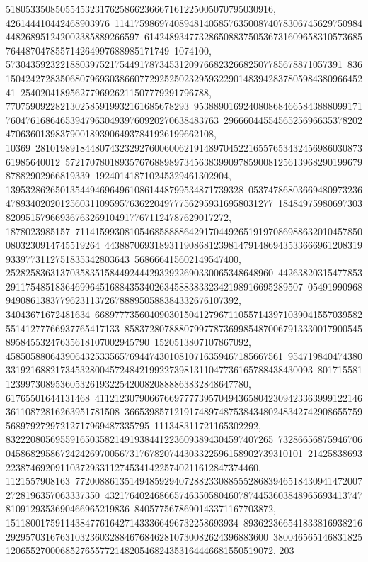 {{{518053350850554532317625866236667161225005070795030916, 426144410442468903976\
11417598697408948140585763500874078306745629750984448268951242002385889266597\
61424893477328650883750536731609658310573685764487047855714264997688985171749\
1074100, 57304359232218803975217544917873453120976682326682507785678871057391\
83615042427283506807969303866077292525023295932290148394283780598438096645241\
25402041895627796926211507779291796788, 7707590922821302585919932161685678293\
95388901692408086846658438880991717604761686465394796304939760920270638483763\
2966604455456525696635378202470636013983790018939064937841926199662108, 10369\
28101989184480743232927600600621914897045221655765343245698603087361985640012\
57217078018935767688989734563839909785900812561396829019967987882902966819339\
192401418710245329461302904, 139532862650135449469649610861448799534871739328\
05374786803669480973236478934020201256031109595763622049777562959316958031277\
18484975980697303820951579669367632691049177671124787629017272, 1878023985157\
71141599308105468588886429170449265191970869886320104578500803230914745519264\
44388706931893119086812398147914869435336669612083199339773112751835342803643\
568666415602149547400, 252825836313703583515844924442932922690330065348648960\
44263820315477853291175485183646996451688435340263458838332342198916695289507\
0549199096894908613837796231137267888950588384332676107392, 34043671672481634\
66897773560409030150412796711055714397103904155703958255141277766937765417133\
85837280788807997787369985487006791333001790054589584553247635618107002945790\
1520513807107867092, 45850588064390643253356576944743010810716359467185667561\
95471984047438033192168821734532800457248421992273981311047736165788438430093\
8017155811239973089536053261932254200820888863832848647780, 61765501644131468\
41121230790667669777739570494365804230942336399912214636110872816263951781508\
36653985712191748974875384348024834274290865575956897927297212717969487335795\
111348311721165302292, 832220805695591650358214919384412236093894304597407265\
73286656875946706045868295867242426970056731767820744303322596158902739310101\
21425838693223874692091103729331127453414225740211612847374460, 1121557908163\
77200886135149485929407288233088555286839465184309414720072728196357063337350\
43217640246866574635058046078744536038489656934137478109129353690466965219836\
8405775678690143371167703872, 15118001759114384776164271433366496732258693934\
89362236654183381693821629295703167631032360328846768462810730082624396883600\
380046565146831825120655270006852765577214820546824353164446681550519072, 203\
}}}

